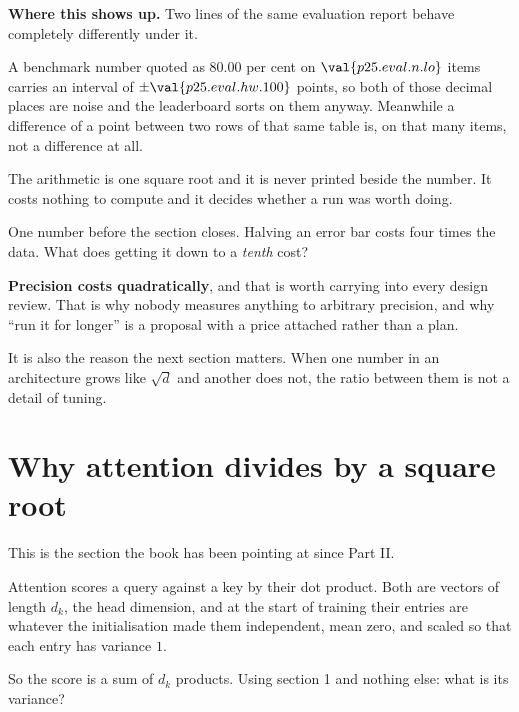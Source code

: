 \begin{fr}
\begin{aibox}
\textbf{Where this shows up.} Two lines of the same evaluation report behave
completely differently under it.

A benchmark number quoted as $\num{80.00}$ per cent on
$\val{p25.eval.n.lo}$ items carries an interval of
$\pm\val{p25.eval.hw.100}$ points, so both of those decimal places are noise
\dash{} and the leaderboard sorts on them anyway. Meanwhile a difference
of a point between two rows of that same table is, on that many items, not a
difference at all.

The arithmetic is one square root and it is never printed beside the number.
It costs nothing to compute and it decides whether a run was worth doing.
\end{aibox}

One number before the section closes. Halving an error bar costs four times
the data. What does getting it down to a \emph{tenth} cost?
\dotline
\nextframe
\end{fr}

\begin{fr}

\textbf{Precision costs quadratically}, and that is worth carrying into every
design review. That is why nobody measures anything
to arbitrary precision, and why \enquote{run it for longer} is a proposal with
a price attached rather than a plan.

It is also the reason the next section matters. When one number in an
architecture grows like $\sqrt{d}$ and another does not, the ratio between
them is not a detail of tuning.
\end{fr}

\section{Why attention divides by a square root}
\label{sec:P25-attention}

\begin{fr}
This is the section the book has been pointing at since Part II.

Attention scores a query against a key by their dot product. Both are vectors
of length $d_k$, the head dimension, and at the start of training their
entries are whatever the initialisation made them \dash{} independent, mean
zero, and scaled so that each entry has variance $1$.

So the score is a sum of $d_k$ products. Using section 1 and nothing else:
what is its variance?
\dotline
\nextframe
\end{fr}

